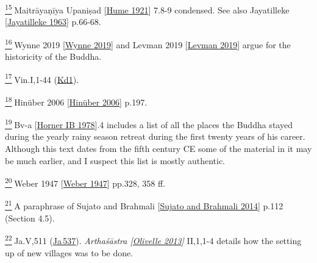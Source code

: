 \label{footprints_split_024.html_fn15}
\hyperref[footprints_split_005.htmlux5cux23fnref15]{\textsuperscript{15}} {Maitrāyaṇīya
Upaniṣad
{{[}\hyperref[footprints_split_023.htmlux5cux23Humeux5cux25201921]{Hume
1921}{]}}} 7.8-9 condensed. See also {Jayatilleke
{{[}\hyperref[footprints_split_022.htmlux5cux23Jayatillekeux5cux25201963]{Jayatilleke
1963}{]}}} p.66-68.

\label{footprints_split_024.html_fn16}
\hyperref[footprints_split_005.htmlux5cux23fnref16]{\textsuperscript{16}} {Wynne
2019
{{[}\hyperref[footprints_split_022.htmlux5cux23Wynneux5cux25202019]{Wynne
2019}{]}}} and {Levman 2019
{{[}\hyperref[footprints_split_022.htmlux5cux23Levmanux5cux25202019]{Levman
2019}{]}}} argue for the historicity of the Buddha.

\label{footprints_split_024.html_fn17}
\hyperref[footprints_split_005.htmlux5cux23fnref17]{\textsuperscript{17}} Vin.I,1-44
(\href{https://suttacentral.net/pli-tv-kd1/en/brahmali}{Kd1}).

\label{footprints_split_024.html_fn18}
\hyperref[footprints_split_005.htmlux5cux23fnref18]{\textsuperscript{18}} {Hinüber
2006
{{[}\hyperref[footprints_split_022.htmlux5cux23Hinuxfcberux5cux25202006]{Hinüber
2006}{]}}} p.197.

\label{footprints_split_024.html_fn19}
\hyperref[footprints_split_005.htmlux5cux23fnref19]{\textsuperscript{19}} {Bv-a
{{[}\hyperref[footprints_split_023.htmlux5cux23Hornerux5cux2520IBux5cux25201978]{Horner
IB 1978}{]}}}.4 includes a list of all the places the Buddha stayed
during the yearly rainy season retreat during the first twenty years of
his career. Although this text dates from the fifth century CE some of
the material in it may be much earlier, and I suspect this list is
mostly authentic.

\label{footprints_split_024.html_fn20}
\hyperref[footprints_split_005.htmlux5cux23fnref20]{\textsuperscript{20}} {Weber
1947
{{[}\hyperref[footprints_split_023.htmlux5cux23Weberux5cux25201947]{Weber
1947}{]}}} pp.328, 358 ff.

\label{footprints_split_024.html_fn21}
\hyperref[footprints_split_005.htmlux5cux23fnref21]{\textsuperscript{21}} A
paraphrase of {Sujato and Brahmali
{{[}\hyperref[footprints_split_022.htmlux5cux23Sujatoux5cux2520andux5cux2520Brahmaliux5cux25202014]{Sujato
and Brahmali 2014}{]}}} p.112 (Section 4.5).

\label{footprints_split_024.html_fn22}
\hyperref[footprints_split_006.htmlux5cux23fnref22]{\textsuperscript{22}} Ja.V,511
(\href{https://suttacentral.net/ja537}{Ja\,537}). \emph{{Arthaśāstra
{{[}\hyperref[footprints_split_022.htmlux5cux23Olivelleux5cux25202013]{Olivelle
2013}{]}}}} II,1,1-4 details how the setting up of new villages was to
be done.


